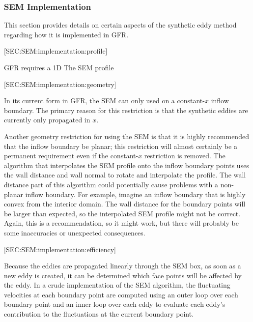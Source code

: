 \subsubsection{SEM Implementation}\label{SEC:SEM:implementation}

This section provides details on certain aspects of the synthetic eddy method
regarding how it is implemented in GFR.
%


%
[SEC:SEM:implementation:profile]

GFR requires a 1D The SEM profile 


[SEC:SEM:implementation:geometry]

In its current form in GFR, the SEM can only used on a constant-$x$ inflow
boundary.
%
The primary reason for this restriction is that the synthetic eddies are
currently only propagated in $x$.


Another geometry restriction for using the SEM is that it is highly recommended
that the inflow boundary be planar; this restriction will almost certainly be a
permanent requirement even if the constant-$x$ restriction is removed.
%
The algorithm that interpolates the SEM profile onto the inflow boundary points
uses the wall distance and wall normal to rotate and interpolate the profile.
%
The wall distance part of this algorithm could potentially cause problems with a
non-planar inflow boundary.
%
For example, imagine an inflow boundary that is highly convex from the interior
domain.
%
The wall distance for the boundary points will be larger than expected, so the
interpolated SEM profile might not be correct.
%
Again, this is a recommendation, so it might work, but there will probably be
some inaccuracies or unexpected consequences.


[SEC:SEM:implementation:efficiency]

Because the eddies are propagated linearly through the SEM box, as soon as a new
eddy is created, it can be determined which face points will be affected by the
eddy.
%
In a crude implementation of the SEM algorithm, the fluctuating velocities at
each boundary point are computed using an outer loop over each boundary point
and an inner loop over each eddy to evaluate each eddy's contribution to the
fluctuations at the current boundary point.

